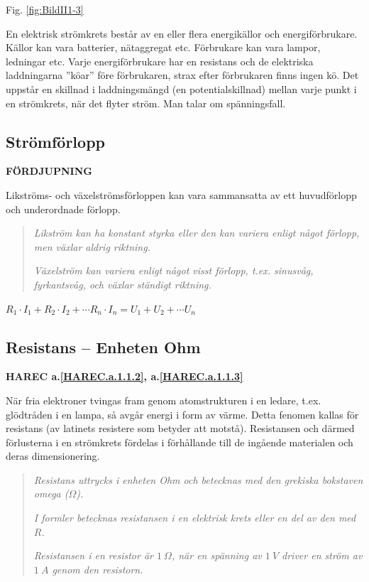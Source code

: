 Fig. \ref{fig:BildII1-3}

En elektrisk strömkrets består av en eller flera energikällor och
energiförbrukare. Källor kan vara batterier, nätaggregat etc. Förbrukare kan
vara lampor, ledningar etc. Varje energiförbrukare har en resistans
och de elektriska laddningarna ''köar'' före förbrukaren, strax efter förbrukaren
finns ingen kö. Det uppstår en skillnad i laddningsmängd (en potentialskillnad)
mellan varje punkt i en strömkrets, när det flyter ström. Man talar om
spänningsfall.

\subsection{Strömförlopp}
\textbf{FÖRDJUPNING}

Likströms- och växelströmsförloppen kan vara sammansatta av ett huvudförlopp och
underordnade förlopp.

\begin{quote}
\emph{Likström kan ha konstant styrka eller den kan variera enligt något
förlopp, men växlar aldrig riktning.}

\emph{Växelström kan variera enligt något visst förlopp, t.ex. sinusvåg,
fyrkantsvåg, och växlar ständigt riktning.}
\end{quote}

\(R_1 \cdot I_1 + R_2 \cdot I_2 + \cdots R_n \cdot I_n = U_1 + U_2 + \cdots U_n\)

\subsection{Resistans -- Enheten Ohm}
\textbf{HAREC a.\ref{HAREC.a.1.1.2}\label{myHAREC.a.1.1.2c}, a.\ref{HAREC.a.1.1.3}\label{myHAREC.a.1.1.3c}}

När fria elektroner tvingas fram genom atomstrukturen i en ledare, t.ex.
glödtråden i en lampa, så avgår energi i form av värme.
Detta fenomen kallas för resistans (av latinets resistere som betyder att
motstå). Resistansen och därmed förlusterna i en strömkrets fördelas i
förhållande till de ingående materialen och deras dimensionering.

\begin{quote}
\emph{Resistans uttrycks i enheten Ohm och betecknas med den grekiska bokstaven
omega (\(\Omega\)).}

\emph{I formler betecknas resistansen i en elektrisk krets eller en del av den med \(R\).}

\emph{Resistansen i en resistor är \(1\ \Omega\), när en spänning av \(1\ V\)
driver en ström av \(1\ A\) genom den resistorn.}
\end{quote}

